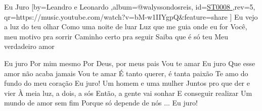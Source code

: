 \beginsong
{Eu Juro %
}[by={Leandro e Leonardo %
},album={@walyssondosreis},
id={\href{https://music.youtube.com/watch?v=bM-w1IIYgpQ&feature=share %
}{ST0008 %
}},rev={5}, %
qr={https://music.youtube.com/watch?v=bM-w1IIYgpQ&feature=share %
}]
\beginverse 
Eu vejo a luz do teu olhar
Como uma noite de luar
Luz que me guia onde eu for
Você, meu motivo pra sorrir
Caminho certo pra seguir
Saiba que é só teu
Meu verdadeiro amor
\endverse

\beginchorus
Eu juro
Por mim mesmo
Por Deus, por meus pais
Vou te amar
Eu juro
Que esse amor não acaba jamais
Vou te amar
É tanto querer, é tanta paixão
Te amo do fundo do meu coração
Eu juro!
\endchorus
{}
\beginverse 
Um homem e uma mulher
Juntos pro que der e vier
À meia luz, a dois, a sós
Então, a gente vai sonhar
E conseguir realizar
Um mundo de amor sem fim
Porque só depende de nós
\endverse
{}
\beginverse 
... Eu juro!
\endverse

